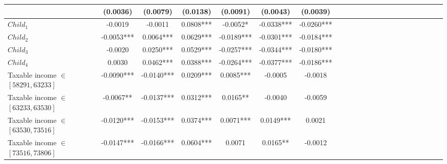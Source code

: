 \begin{subappendices}
{\begin{landscape}
\begin{table}[H]
{\begin{tabular}{lccccccccccccccccccccc}
                                                  & (0.0036)                &     (0.0079)               &   (0.0138)                     &  (0.0091)                    &                   (0.0043)       &       (0.0039)                             \\
\midrule                                                  
$Child_1$                                         & -0.0019                 &     -0.0011                &   0.0808***                    &  -0.0052*                    &                   -0.0338***     &       -0.0260***                           \\
$Child_2$                                         & -0.0053***              &     0.0064***              &   0.0629***                    &  -0.0189***                  &                   -0.0301***     &       -0.0184***                           \\
$Child_3$                                         & -0.0020                 &     0.0250***              &   0.0529***                    &  -0.0257***                  &                   -0.0344***     &       -0.0180***                           \\
$Child_4$                                         & 0.0030                  &     0.0462***              &   0.0388***                    &  -0.0264***                  &                   -0.0377***     &       -0.0186***                           \\
\midrule
Taxable income $\in$ $[58291,63233]$              & -0.0090***              &     -0.0140***             &   0.0209***                    &  0.0085***                   &                   -0.0005        &       -0.0018                              \\
Taxable income $\in$ $[63233,63530]$              & -0.0067**               &     -0.0137***             &   0.0312***                    &  0.0165**                    &                   -0.0040        &       -0.0059                              \\
Taxable income $\in$ $[63530,73516]$              & -0.0120***              &     -0.0153***             &   0.0374***                    &  0.0071***                   &                   0.0149***      &       0.0021                               \\
Taxable income $\in$ $[73516,73806]$              & -0.0147***              &     -0.0166***             &   0.0604***                    &  0.0071                      &                   0.0165**       &       -0.0012                              \\

\end{tabular}}
\end{table}
\end{landscape}}
\end{subappendices}
